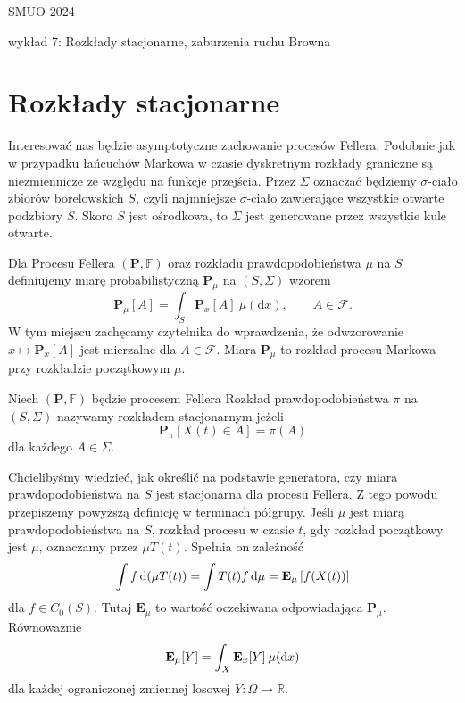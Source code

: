 \documentclass{article}
\begin{document}
SMUO 2024

wykład 7: Rozkłady stacjonarne, zaburzenia ruchu Browna

\section{Rozkłady stacjonarne}

	Interesować nas będzie asymptotyczne zachowanie procesów Fellera. 
	Podobnie jak w przypadku łańcuchów Markowa w czasie dyskretnym
	rozkłady graniczne są niezmiennicze ze względu na funkcje przejścia.
	Przez $\Sigma$ oznaczać będziemy $\sigma$-ciało zbiorów borelowskich $S$,
	czyli najmniejsze $\sigma$-ciało zawierające wszystkie otwarte podzbiory $S$. 
	Skoro $S$ jest ośrodkowa, to $\Sigma$ jest generowane przez wszystkie kule otwarte.

	Dla Procesu Fellera $(\mathbf{P}, \mathbb{F})$ oraz rozkładu prawdopodobieństwa 
	$\mu$ na $S$ definiujemy miarę probabilistyczną $\mathbf{P}_\mu$ na $(S, \Sigma)$ 
	wzorem
	\begin{equation*}
		\mathbf{P}_\mu[A] 
		= \int_S \mathbf{P}_x[A] \: \mu(\mathrm{d}x), 
		\qquad A \in \mathcal{F}.
	\end{equation*}
	W tym miejscu zachęcamy czytelnika do wprawdzenia, że odwzorowanie $x \mapsto \mathbf{P}_x[A]$ 
	jest mierzalne dla $A \in \mathcal{F}$. Miara $\mathbf{P}_\mu$ to rozkład procesu Markowa
	przy rozkładzie początkowym $\mu$. 
	
	\begin{defn}
		Niech $(\mathbf{P}, \mathbb{F})$ będzie procesem Fellera
		Rozkład prawdopodobieństwa $\pi$ na $(S, \Sigma)$ nazywamy rozkładem stacjonarnym 
		jeżeli
		\begin{equation*}
			\mathbf{P}_\pi \left[ X(t) \in A \right] = \pi(A)
		\end{equation*}
		dla każdego $A \in \Sigma$.
	\end{defn}

	Chcielibyśmy wiedzieć, jak określić na podstawie generatora, 
	czy miara prawdopodobieństwa na $S$ jest stacjonarna dla procesu Fellera. 
	Z tego powodu przepiszemy powyższą definicję w terminach półgrupy.
	Jeśli $\mu$ jest miarą prawdopodobieństwa na $S$, rozkład procesu w czasie $t$, 
	gdy rozkład początkowy jest $\mu$, 
	oznaczamy przez $\mu T(t)$. Spełnia on zależność
	\[
		\int f \, \mathrm{d}(\mu T(t)) = \int T(t)f \, \mathrm{d} \mu = \mathbf{E}_\mu \left[ f(X(t)) \right] 
	\]
	dla $f \in C_0(S)$. Tutaj $\mathbf{E}_\mu$ to wartość oczekiwana odpowiadająca $\mathbf{P}_\mu$. 
	Równoważnie
	\begin{equation*}
		\mathbf{E}_\mu[Y] = \int_X \mathbf{E}_x[Y] \: \mu(\mathrm{d}x)
	\end{equation*}
	dla każdej ograniczonej zmiennej losowej $Y \colon \Omega \to \mathbb{R}$.
\end{document}
